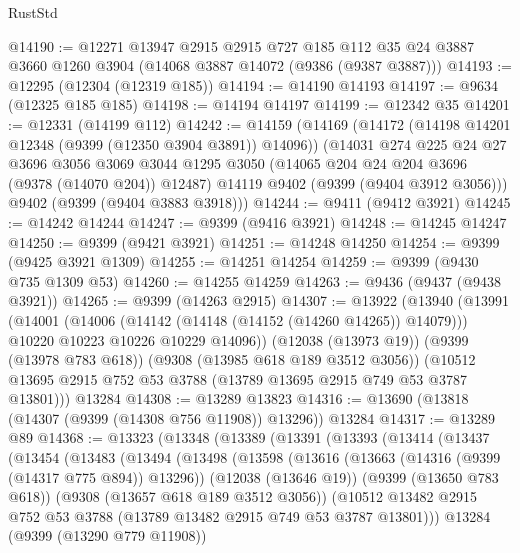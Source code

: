 \begin{lexlean}{RustStd}
\begin{coremodule}
@14190 := @12271
    @13947
    @2915
    @2915
    @727
    @185
    @112
    @35
    @24
    @3887
    @3660
    @1260
    @3904
    (@14068 @3887 @14072 (@9386 (@9387 @3887)))
@14193 := @12295 (@12304 (@12319 @185))
@14194 := @14190 @14193
@14197 := @9634 (@12325 @185 @185)
@14198 := @14194 @14197
@14199 := @12342 @35
@14201 := @12331 (@14199 @112)
@14242 := @14159
    (@14169
      (@14172 (@14198 @14201 @12348 (@9399 (@12350 @3904 @3891)) @14096))
      (@14031
        @274
        @225
        @24
        @27
        @3696
        @3056
        @3069
        @3044
        @1295
        @3050
        (@14065 @204 @24 @204 @3696 (@9378 (@14070 @204)) @12487)
        @14119
        @9402
        (@9399 (@9404 @3912 @3056)))
      @9402
      (@9399 (@9404 @3883 @3918)))
@14244 := @9411 (@9412 @3921)
@14245 := @14242 @14244
@14247 := @9399 (@9416 @3921)
@14248 := @14245 @14247
@14250 := @9399 (@9421 @3921)
@14251 := @14248 @14250
@14254 := @9399 (@9425 @3921 @1309)
@14255 := @14251 @14254
@14259 := @9399 (@9430 @735 @1309 @53)
@14260 := @14255 @14259
@14263 := @9436 (@9437 (@9438 @3921))
@14265 := @9399 (@14263 @2915)
@14307 := @13922
    (@13940
      (@13991
        (@14001
          (@14006 (@14142 (@14148 (@14152 (@14260 @14265)) @14079)))
          @10220
          @10223
          @10226
          @10229
          @14096))
      (@12038 (@13973 @19))
      (@9399 (@13978 @783 @618))
      (@9308 (@13985 @618 @189 @3512 @3056))
      (@10512 @13695 @2915 @752 @53 @3788 (@13789 @13695 @2915 @749 @53 @3787 @13801)))
    @13284
@14308 := @13289 @13823
@14316 := @13690 (@13818 (@14307 (@9399 (@14308 @756 @11908)) @13296)) @13284
@14317 := @13289 @89
@14368 := @13323
    (@13348
      (@13389
        (@13391
          (@13393
            (@13414
              (@13437
                (@13454
                  (@13483
                    (@13494
                      (@13498
                        (@13598
                          (@13616
                            (@13663 (@14316 (@9399 (@14317 @775 @894)) @13296))
                            (@12038 (@13646 @19))
                            (@9399 (@13650 @783 @618))
                            (@9308 (@13657 @618 @189 @3512 @3056))
                            (@10512
                              @13482
                              @2915
                              @752
                              @53
                              @3788
                              (@13789 @13482 @2915 @749 @53 @3787 @13801)))
                          @13284
                          (@9399 (@13290 @779 @11908))

\end{coremodule}
\end{lexlean}

